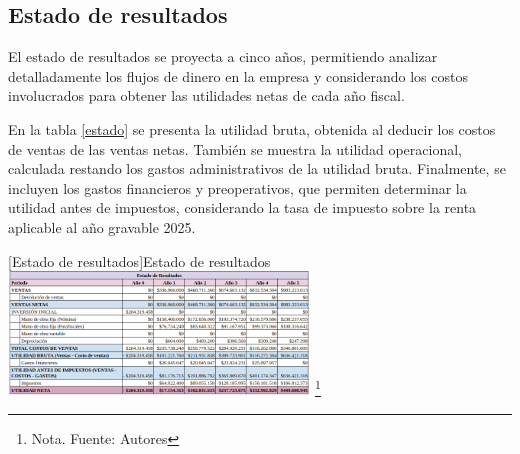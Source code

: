 \subsection{Estado de resultados}

El estado de resultados se proyecta a cinco años, permitiendo analizar detalladamente los flujos de dinero en la empresa y considerando los costos involucrados para obtener las utilidades netas de cada año fiscal.

En la tabla \ref{estado} se presenta la utilidad bruta, obtenida al deducir los costos de ventas de las ventas netas. También se muestra la utilidad operacional, calculada restando los gastos administrativos de la utilidad bruta. Finalmente, se incluyen los gastos financieros y preoperativos, que permiten determinar la utilidad antes de impuestos, considerando la tasa de impuesto sobre la renta aplicable al año gravable 2025.

\vspace{2mm}
\begin{minipage}{0.9\textwidth}
\centering
{}[Estado de resultados]{Estado de resultados}
\label{estado}
\includegraphics[width=0.6\textwidth]{Content/Images/AF/EstadoDeResultados.png}
\footnote{Nota. \textup{Fuente: Autores}}
\end{minipage}
\newpage